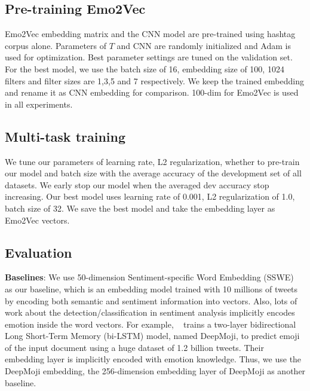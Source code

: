 \documentclass[11pt,a4paper]{article}
\begin{document}
\subsection{Pre-training Emo2Vec}
Emo2Vec embedding  matrix and the CNN model are pre-trained using hashtag corpus alone. Parameters of $T$ and CNN are randomly initialized and Adam is used for optimization. Best parameter settings are tuned on the validation set. For the best model, we use the batch size of 16, embedding size of 100, 1024 filters and filter sizes are 1,3,5 and 7 respectively. We keep the trained embedding and rename it as CNN embedding for comparison. 100-dim for Emo2Vec is used in all experiments.

\subsection{Multi-task training}
We tune our parameters of learning rate, L2 regularization, whether to pre-train our model and batch size with the average accuracy of the development set of all datasets. We early stop our model when the averaged dev accuracy stop increasing. Our best model uses learning rate of 0.001, L2 regularization of 1.0, batch size of 32. We save the best model and take the embedding layer as Emo2Vec vectors.  

\subsection{Evaluation}

\noindent\textbf{Baselines}: We use 50-dimension Sentiment-specific Word Embedding (SSWE) ~\cite{Tang2016} as our baseline, which is an embedding model  trained with 10 millions of tweets by encoding both semantic and sentiment information into vectors. Also, lots of work about the detection/classification in sentiment analysis implicitly encodes emotion inside the word vectors. For example, ~ trains a two-layer bidirectional Long Short-Term Memory (bi-LSTM) model, named DeepMoji, to predict emoji of the input document using a huge dataset of 1.2 billion tweets. Their embedding layer is implicitly encoded with emotion knowledge. Thus, we use the DeepMoji embedding, the 256-dimension embedding layer of DeepMoji as another baseline. 
\end{document}
